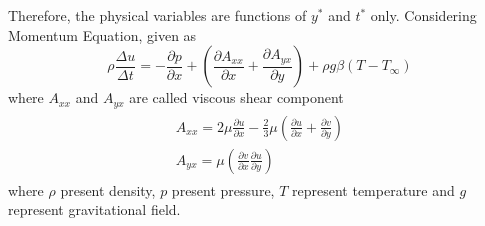\documentclass[11pt]{report}
\newcommand{\sps}{\\[0.2cm]}
\newcommand{\NI}{\noindent}
\begin{document}
	\NI Therefore, the physical variables are functions of $y^*$ and $t^*$ only. Considering Momentum Equation, given as
	\begin{equation}
		\rho\frac{\Delta u}{\Delta t} = - \frac{\partial p}{\partial x} + \left(\frac{\partial A_{xx}}{\partial x} + \frac{\partial A_{yx}}{\partial y}\right) + \rho g\beta(T-T_\infty)
	\end{equation}
	where $A_{xx}$ and $A_{yx}$ are called viscous shear component
	\begin{eqnarray}
		\begin{split}
			A_{xx} = 2\mu\frac{\partial u}{\partial x}- \frac{2}{3}\mu\left(\frac{\partial u}{\partial x} + \frac{\partial v}{\partial y}\right)\sps
			A_{yx} = \mu\left(\frac{\partial v}{\partial x}\frac{\partial u}{\partial y}\right)
		\end{split}
	\end{eqnarray}
	where $\rho$ present density, $p$ present pressure, $T$ represent temperature and $g$ represent gravitational field.\sps
	
\end{document}
